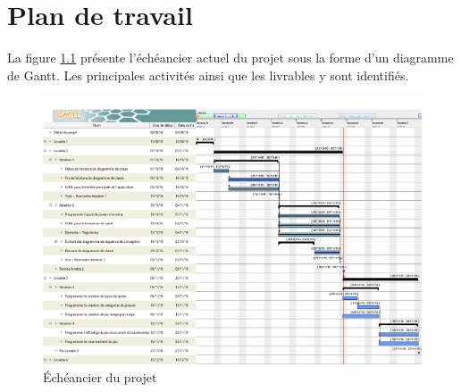 \chapter{Plan de travail}
\label{s:echeancier2}

La figure \ref{fig:gantt2} présente l'échéancier actuel du projet sous la forme d'un diagramme de Gantt. Les principales activités ainsi que les livrables y sont identifiés.

\begin{figure}[p]
	\centering
	\includegraphics[scale=0.35, angle=90]{fig/gantt2.png}
	\caption{Échéancier du projet}
	\label{fig:gantt2}
\end{figure}